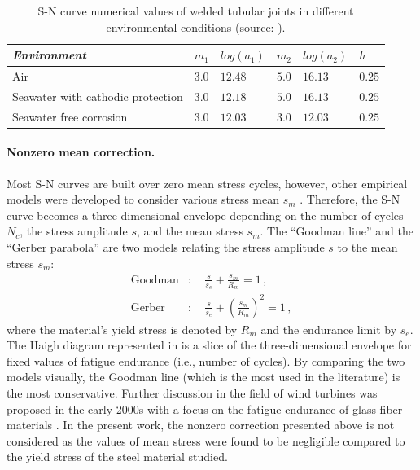 \begin{table}[h]
    \centering
    \caption{S-N curve numerical values of welded tubular joints in different environmental conditions (source: \citealp{dnv_fatigue_2016}).}
    \begin{tabular}{l|l|l|l|l|l}
     \hline
     \textit{Environment} & $m_1$ & $log(a_1)$ & $m_2$ & $log(a_2)$ & $h$\\
     \hline
     Air & $3.0$ & $12.48$ & $5.0$ & $16.13$ & $0.25$\\
     Seawater with cathodic protection & $3.0$ & $12.18$ & $5.0$ & $16.13$ & $0.25$\\ Seawater free corrosion & $3.0$ & $12.03$ & $3.0$ & $12.03$ & $0.25$\\ 
    \end{tabular}
    \label{tab:sn_table}
\end{table}

\paragraph{Nonzero mean correction.}
Most S-N curves are built over zero mean stress cycles, however, other empirical models were developed to consider various stress mean $s_m$ \citep{suresh_1998_fatigue_book}. 
Therefore, the S-N curve becomes a three-dimensional envelope depending on the number of cycles $N_c$, the stress amplitude $s$, and the mean stress $s_m$. 
The ``Goodman line'' and the ``Gerber parabola'' are two models relating the stress amplitude $s$ to the mean stress $s_m$:  
\begin{align}
    \mathrm{Goodman} &:\quad \frac{s}{s_e} + \frac{s_m}{R_m} = 1\, ,\\
    \mathrm{Gerber} &:\quad \frac{s}{s_e} + \left(\frac{s_m}{R_m}\right)^2 = 1\, ,
\end{align}
where the material's yield stress is denoted by $R_m$ and the endurance limit by $s_e$. 
The Haigh diagram represented in  is a slice of the three-dimensional envelope for fixed values of fatigue endurance (i.e., number of cycles). 
By comparing the two models visually, the Goodman line (which is the most used in the literature) is the most conservative. 
Further discussion in the field of wind turbines was proposed in the early 2000s with a focus on the fatigue endurance of glass fiber materials \citep{sutherland_2000_fatigueWT}. 
In the present work, the nonzero correction presented above is not considered as the values of mean stress were found to be negligible compared to the yield stress of the steel material studied. 

